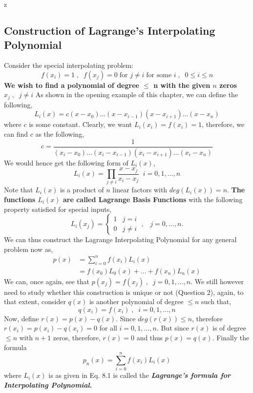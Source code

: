 z\documentclass[a4paper,12pt,twoside]{book}
\newcommand{\nll}[0]{\newline\newline}
\newcommand{\tit}[1]{\textit{#1}}
\begin{document}
\subsection{Construction of Lagrange's Interpolating Polynomial}
Consider the special interpolating problem:
\[f(x_i) = 1\;,\;\;f(x_j) = 0 \;\text{for } j\neq i \; \text{for some } i\;,\;\;0\le i\le n\]
\textbf{We wish to find a polynomial of degree $\le$ n with the given $n$ zeros $x_j\;,\;\;j\neq i$}
\nll
As shown in the opening example of this chapter, we can define the following,
\[ L_i(x) = c(x-x_0)\dots(x-x_{i-1})(x-x_{i+1})\dots(x-x_{n}) \]
where $c$ is some constant.
\nll
Clearly, we want $L_i(x_i) = f(x_i) = 1$, therefore, we can find $c$ as the following,
\[ c = \frac{1}{(x_i-x_0)\dots(x_i-x_{i-1})(x_i-x_{i+1})\dots(x_i-x_{n})} \]
We would hence get the following form of $L_i(x)$,
\begin{equation}
    \boxed{L_i(x) = \prod_{j\neq i} \frac{x-x_j}{x_i -x_j}\;\; i = 0,1,\dots,n}
\end{equation}
Note that $L_i(x)$ is a product of $n$ linear factors with $deg(L_i(x)) = n$. \textbf{The functions $L_i(x)$ are called Lagrange Basis Functions} with the following property satisfied for special inputs,
\begin{equation}
    L_i(x_j) = \begin{cases} 1 & j=i\\0 & j\neq i\end{cases}\;, \;\;\;j = 0,\dots,n.
\end{equation}
We can thus construct the Lagrange Interpolating Polynomial for any general problem now as,
\begin{equation}
    \begin{split}
        p(x) &= \sum_{i=0}^n f(x_i) L_i(x)\\
        &= f(x_0)L_0(x) + \dots + f(x_n)L_n(x)
    \end{split}
\end{equation}
We can, once again, see that $p(x_j) = f(x_j)\;,\;\;j=0,1,\dots,n$.
\nll
We still however need to study whether this construction is unique or not (Question 2), again, to that extent, consider $q(x)$ is another polynomial of degree $\le n$ such that,
\[ q(x_i) = f(x_i)\;,\;\;i=0,1,\dots,n \]
Now, define $r(x) = p(x) - q(x)$. Since $deg(r(x))\le n$, therefore $r(x_i) = p(x_i) - q(x_i) = 0$ for all $i = 0,1,\dots,n$. But since $r(x)$ is of degree $\le n$ with $n+1$ zeros, therefore, $r(x) = 0$ and thus $p(x) = q(x)$.
\nll
Finally the formula 
\begin{equation}
    \boxed{p_n(x) = \sum_{i=0}^nf(x_i)L_i(x)}
\end{equation}
where $L_i(x)$ is as given in Eq. 8.1 is called the \textbf{\tit{Lagrange's formula for Interpolating Polynomial}.}
\end{document}
